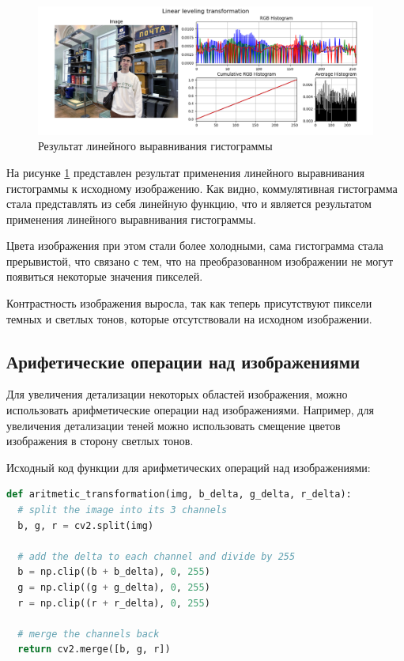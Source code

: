 \begin{figure}[H]
    \centering
    \includegraphics[width=\textwidth]{../results/Linear leveling transformation.png}
    \caption{Результат линейного выравнивания гистограммы}
    \label{fig:linear}
\end{figure}

На рисунке \ref{fig:linear} представлен результат применения линейного выравнивания гистограммы к исходному изображению. Как видно, коммулятивная гистограмма стала представлять из себя линейную функцию, что и является результатом применения линейного выравнивания гистограммы. 

Цвета изображения при этом стали более холодными, сама гистограмма стала прерывистой, что связано с тем, что на преобразованном изображении не могут появиться некоторые значения пикселей. 

Контрастность изображения выросла, так как теперь присутствуют пиксели темных и светлых тонов, которые отсутствовали на исходном изображении. 

\subsection{Арифетические операции над изображениями}

Для увеличения детализации некоторых областей изображения, можно использовать арифметические операции над изображениями. Например, для увеличения детализации теней можно использовать смещение цветов изображения в сторону светлых тонов.

Исходный код функции для арифметических операций над изображениями:

\begin{lstlisting}[language=Python]
def aritmetic_transformation(img, b_delta, g_delta, r_delta):
  # split the image into its 3 channels
  b, g, r = cv2.split(img)

  # add the delta to each channel and divide by 255
  b = np.clip((b + b_delta), 0, 255) 
  g = np.clip((g + g_delta), 0, 255) 
  r = np.clip((r + r_delta), 0, 255) 

  # merge the channels back
  return cv2.merge([b, g, r])
\end{lstlisting}


